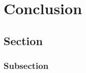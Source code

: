 
\chapter{Conclusion}\label{chapter:conclusion}

\section{Section}
\cite{latex}
\subsection{Subsection}

